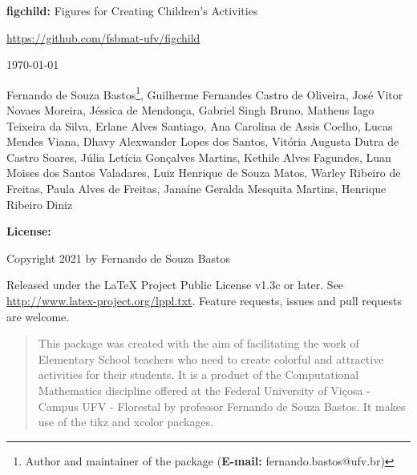 \documentclass{article}
\begin{document}
\begin{titlepage}

\begin{center}

\textbf{figchild:} Figures for Creating Children's Activities

\vspace{0.5cm}

\url{https://github.com/fsbmat-ufv/figchild}

\vspace{0.5cm}


\vspace{0.5cm}

\today

\end{center}

\vspace{2cm}



 Fernando de Souza Bastos\footnote{Author and maintainer of the package (\textbf{E-mail:} fernando.bastos@ufv.br)}, 
 Guilherme Fernandes Castro de Oliveira, 
 José Vitor Novaes Moreira,
 Jéssica de Mendonça,
 Gabriel Singh Bruno,
 Matheus Iago Teixeira da Silva,
 Erlane Alves Santiago,
 Ana Carolina de Assis Coelho,
 Lucas Mendes Viana,
 Dhavy Alexwander Lopes dos Santos,
 Vitória Augusta Dutra de Castro Soares,
 Júlia Letícia Gonçalves Martins,
 Kethile Alves Fagundes,
 Luan Moises dos Santos Valadares,
 Luiz Henrique de Souza Matos,
 Warley Ribeiro de Freitas,
 Paula Alves de Freitas,
 Janaíne Geralda Mesquita Martins,
 Henrique Ribeiro Diniz
 
\vspace{3cm}

\noindent \textbf{License:}

\vspace{1cm}

\noindent Copyright 2021 by Fernando de Souza Bastos

\vspace{1cm}

\noindent Released under the LaTeX Project Public License v1.3c or later. See \url{http://www.latex-project.org/lppl.txt}. Feature requests, issues and pull requests are welcome.

\end{titlepage}

\begin{abstract}
This package was created with the aim of facilitating the work of Elementary School teachers who need to create colorful and attractive activities for their students. It is a product of the Computational Mathematics discipline offered at the Federal University of Viçosa - Campus UFV - Florestal by professor Fernando de Souza Bastos. It makes use of the tikz and xcolor packages.
\end{abstract}
\end{document}

